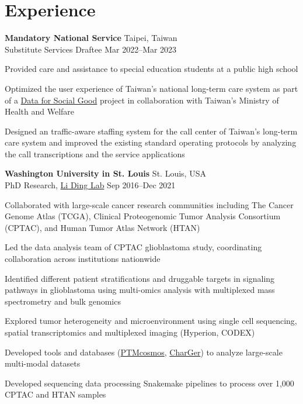 \section{Experience}

\begin{entrylist}

\item \textbf{Mandatory National Service} \hfill Taipei, Taiwan\\
Substitute Services Draftee \hfill
Mar 2022--Mar 2023
\begin{detaillist}
    \item Provided care and assistance to special education students at a public high school
    \item Optimized the user experience of Taiwan's national long-term care system as part of a \href{https://d4sg.org/}{Data for Social Good} project in collaboration with Taiwan's Ministry of Health and Welfare
    \item Designed an traffic-aware staffing system for the call center of Taiwan's long-term care system and improved the existing standard operating protocols by analyzing the call transcriptions and the service applications
\end{detaillist}

\item \textbf{Washington University in St. Louis} \hfill St. Louis, USA\\
PhD Research, \href{https://dinglab.wustl.edu/}{Li Ding Lab} \hfill
Sep 2016--Dec 2021
\begin{detaillist}
    \item Collaborated with large-scale cancer research communities including The Cancer Genome Atlas (TCGA), Clinical Proteogenomic Tumor Analysis Consortium (CPTAC), and Human Tumor Atlas Network (HTAN)
    \item Led the data analysis team of CPTAC glioblastoma study, coordinating collaboration across institutions nationwide
    \item Identified different patient stratifications and druggable targets in signaling pathways in glioblastoma using multi-omics analysis with multiplexed mass spectrometry and bulk genomics
    \item Explored tumor heterogeneity and microenvironment using single cell sequencing, spatial transcriptomics and multiplexed imaging (Hyperion, CODEX)
    \item Developed tools and databases (\href{https://ptmcosmos.wustl.edu/}{PTMcosmos}, \href{https://github.com/ding-lab/CharGer}{CharGer}) to analyze large-scale multi-modal datasets
    \item Developed sequencing data processing Snakemake pipelines to process over 1,000 CPTAC and HTAN samples
\end{detaillist}


\end{entrylist}
